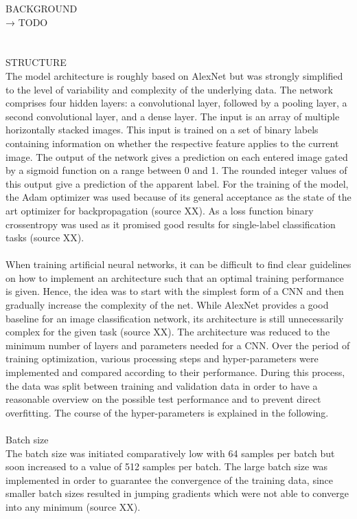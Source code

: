 BACKGROUND\\
→ TODO \\
\\
\\
STRUCTURE \\
The model architecture is roughly based on AlexNet but was strongly simplified to the level of variability and complexity of the underlying data. The network comprises four hidden layers: a convolutional layer, followed by a pooling layer, a second convolutional layer, and a dense layer. The input is an array of multiple horizontally stacked images. This input is trained on a set of binary labels containing information on whether the respective feature applies to the current image. The output of the network gives a prediction on each entered image gated by a sigmoid function on a range between 0 and 1. The rounded integer values of this output give a prediction of the apparent label. For the training of the model, the Adam optimizer was used because of its general acceptance as the state of the art optimizer for backpropagation (source XX). As a loss function binary crossentropy was used as it promised good results for single-label classification tasks (source XX). \\
\\
When training artificial neural networks, it can be difficult to find clear guidelines on how to implement an architecture such that an optimal training performance is given.
Hence, the idea was to start with the simplest form of a CNN and then gradually increase the complexity of the net. While AlexNet provides a good baseline for an image classification network, its architecture is still unnecessarily complex for the given task (source XX). The architecture was reduced to the minimum number of layers and parameters needed for a CNN. Over the period of training optimization, various processing steps and hyper-parameters were implemented and compared according to their performance. During this process, the data was split between training and validation data in order to have a reasonable overview on the possible test performance and to prevent direct overfitting.
The course of the hyper-parameters is explained in the following. \\
\\
Batch size \\
The batch size was initiated comparatively low with 64 samples per batch but soon increased to a value of 512 samples per batch. The large batch size was implemented in order to guarantee the convergence of the training data, since smaller batch sizes resulted in jumping gradients which were not able to converge into any minimum (source XX). \\
